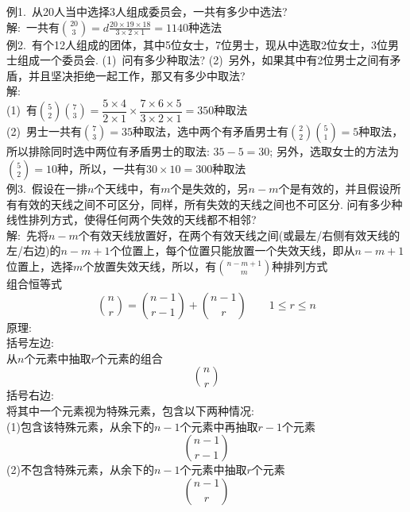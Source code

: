 例1.\ 从20人当中选择3人组成委员会，一共有多少中选法?\\
解:\ 一共有$\binom{20}{3}=d\frac{20\times 19\times 18}{3\times 2\times 1}=1140$种选法\\[1ex]

例2.\ 有个12人组成的团体，其中5位女士，7位男士，现从中选取2位女士，3位男士组成一个委员会.
(1)\ 问有多少种取法?
(2)\ 另外，如果其中有2位男士之间有矛盾，并且坚决拒绝一起工作，那又有多少中取法?\\
解:\\
(1)\ 有$\binom{5}{2}\binom{7}{3}=\dfrac{5\times 4}{2\times 1}\times\dfrac{7\times 6\times 5}{3\times 2\times 1}=350$种取法\\
(2)\ 男士一共有$\binom{7}{3}=35$种取法，选中两个有矛盾男士有$\binom{2}{2}\binom{5}{1}=5$种取法，所以排除同时选中两位有矛盾男士的取法: $35-5=30$; 另外，选取女士的方法为$\binom{5}{2}=10$种，所以，一共有$30\times 10=300$种取法\\[1ex]

例3.\ 假设在一排$n$个天线中，有$m$个是失效的，另$n-m$个是有效的，并且假设所有有效的天线之间不可区分，同样，所有失效的天线之间也不可区分. 问有多少种线性排列方式，使得任何两个失效的天线都不相邻?\\
解:\ 先将$n-m$个有效天线放置好，在两个有效天线之间(或最左/右侧有效天线的左/右边)的$n-m+1$个位置上，每个位置只能放置一个失效天线，即从$n-m+1$位置上，选择$m$个放置失效天线，所以，有$\binom{n-m+1}{m}$种排列方式\\[2ex]

组合恒等式
\[\binom{n}{r}=\binom{n-1}{r-1}+\binom{n-1}{r}\qquad 1\leqslant r\leqslant n\]
原理:\\
括号左边:\\
从$n$个元素中抽取$r$个元素的组合
\[\binom{n}{r}\]
括号右边:\\
将其中一个元素视为特殊元素，包含以下两种情况:\\
(1)包含该特殊元素，从余下的$n-1$个元素中再抽取$r-1$个元素
\[\binom{n-1}{r-1}\]
(2)不包含特殊元素，从余下的$n-1$个元素中抽取$r$个元素
\[\binom{n-1}{r}\]\\[2ex]

{\par\centering
{}
\par}\vspace{2ex}

